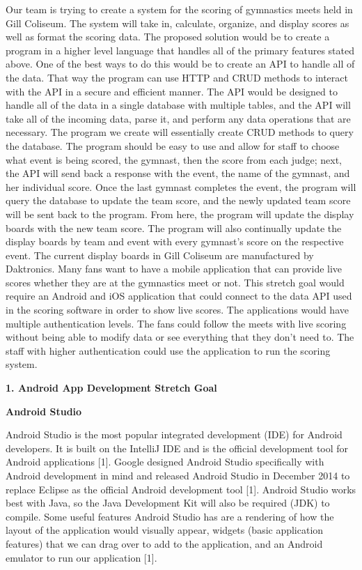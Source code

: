 \documentclass[letterpaper,10pt,draftclsnofoot,onecolumn,]{IEEEtran}
\begin{document}
\par Our team is trying to create a system for the scoring of gymnastics meets held in Gill Coliseum. The system will take in, calculate, organize, and display scores as well as format the scoring data. The proposed solution would be to create a program in a higher level language that handles all of the primary features stated above. One of the best ways to do this would be to create an API to handle all of the data. That way the program can use HTTP and CRUD methods to interact with the API in a secure and efficient manner. The API would be designed to handle all of the data in a single database with multiple tables, and the API will take all of the incoming data, parse it, and perform any data operations that are necessary. The program we create will essentially create CRUD methods to query the database. The program should be easy to use and allow for staff to choose what event is being scored, the gymnast, then the score from each judge; next, the API will send back a response with the event, the name of the gymnast, and her individual score. Once the last gymnast completes the event, the program will query the database to update the team score, and the newly updated team score will be sent back to the program. From here, the program will update the display boards with the new team score. The program will also continually update the display boards by team and event with every gymnast's score on the respective event. The current display boards in Gill Coliseum are manufactured by Daktronics. Many fans want to have a mobile application that can provide live scores whether they are at the gymnastics meet or not. This stretch goal would require an Android and iOS application that could connect to the data API used in the scoring software in order to show live scores. The applications would have multiple authentication levels. The fans could follow the meets with live scoring without being able to modify data or see everything that they don't need to. The staff with higher authentication could use the application to run the scoring system.\\

\begin{center}
\textbf{1. Android App Development Stretch Goal}\\
\end{center}

\textbf{Android Studio}
\par Android Studio is the most popular integrated development (IDE) for Android developers. It is built on the IntelliJ IDE and is the official development tool for Android applications [1]. Google designed Android Studio specifically with Android development in mind and released Android Studio in December 2014 to replace Eclipse as the official Android development tool [1]. Android Studio works best with Java, so the Java Development Kit will also be required (JDK) to compile. Some useful features Android Studio has are a rendering of how the layout of the application would visually appear, widgets (basic application features) that we can drag over to add to the application, and an Android emulator to run our application [1].
\end{document}
